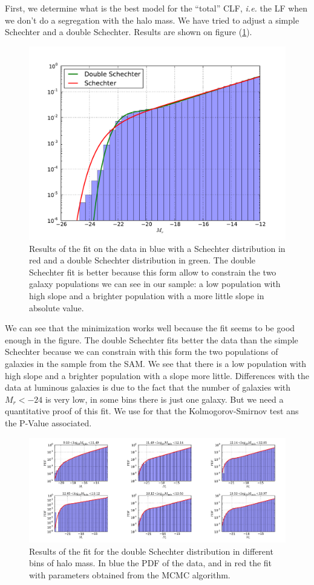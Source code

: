 First, we determine what is the best model for the ``total'' CLF, \textit{i.e.}
the LF when we don't do a segregation with the halo mass. We have tried to
adjust a simple Schechter and a double Schechter. Results are shown on figure
(\ref{fig:fitguo}).
%
\begin{figure}[ht]
    \centering
    \includegraphics[width=0.5\linewidth]{figures/lf/MCMCfitGUO}
    \caption{Results of the fit on the data in blue with a Schechter
        distribution in red and a double Schechter distribution in green. The
        double Schechter fit is better because this form allow to constrain the
        two galaxy populations we can see in our sample: a low population with
    high slope and a brighter population with a more little slope in absolute
value.}
\label{fig:fitguo}
\end{figure}
%
We can see that the minimization works well because the fit seems to be good
enough in the figure. The double Schechter fits better the data than the simple
Schechter because we can constrain with this form the two populations of
galaxies in the sample from the \citet{Guo+11} SAM\@. We see that there is a
low population with high slope and a brighter population with a slope more
little. Differences with the data at luminous galaxies is due to the fact that
the number of galaxies with $M_r<-24$ is very low, in some bins there is just
one galaxy. But we need a quantitative proof of this fit. We use for that the
Kolmogorov-Smirnov test ans the P-Value associated.
\begin{figure}[H]
    \centering
    \includegraphics[width=\linewidth]{figures/lf/FitDblSchechterGuo}
    \caption{Results of the fit for the double Schechter distribution in
    different bins of halo mass. In blue the PDF of the data, and in red the
fit with parameters obtained from the MCMC algorithm.}
\label{fig:fitguodblsch}
\end{figure}

